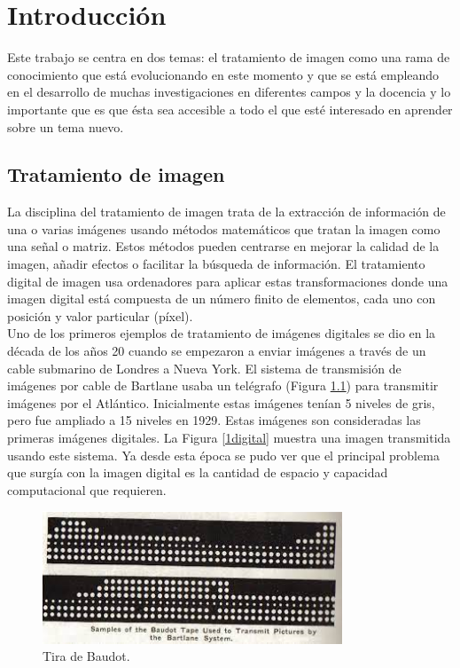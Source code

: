 \chapter{Introducción}

Este trabajo se centra en dos temas: el tratamiento de imagen como una rama de conocimiento que está evolucionando en este momento y que se está empleando en el desarrollo de muchas investigaciones en diferentes campos y la docencia y lo importante que es que ésta sea accesible a todo el que esté interesado en aprender sobre un tema nuevo.\\

\section{Tratamiento de imagen}

La disciplina del tratamiento de imagen trata de la extracción de información de una o varias imágenes usando métodos matemáticos que tratan la imagen como una señal o matriz. Estos métodos pueden centrarse en mejorar la calidad de la imagen, añadir efectos o facilitar la búsqueda de información. El tratamiento digital de imagen usa ordenadores para aplicar estas transformaciones donde una imagen digital está compuesta de un número finito de elementos, cada uno con posición y valor particular (píxel).\\

Uno de los primeros ejemplos de tratamiento de imágenes digitales se dio en la década de los años 20 cuando se empezaron a enviar imágenes a través de un cable submarino de Londres a Nueva York. El sistema de transmisión de imágenes por cable de Bartlane usaba un telégrafo (Figura \ref{telegrafo}) para transmitir imágenes por el Atlántico. Inicialmente estas imágenes tenían 5 niveles de gris, pero fue ampliado a 15 niveles en 1929. Estas imágenes son consideradas las primeras imágenes digitales. La Figura \ref{1digital} muestra una imagen transmitida usando este sistema. Ya desde esta época se pudo ver que el principal problema que surgía con la imagen digital es la cantidad de espacio y capacidad computacional que requieren.\\

\begin{figure}[h]
\centering
\includegraphics[width=0.8\textwidth]{imagenes/telegrafo}
\caption{Tira de Baudot.}
\label{telegrafo}
\end{figure}

